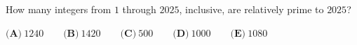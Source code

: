 How many integers from $1$ through $2025$, inclusive, are relatively prime to $2025$?

$\textbf{(A)}~1240\qquad\textbf{(B)}~1420\qquad\textbf{(C)}~500\qquad\textbf{(D)}~1000\qquad\textbf{(E)}~1080\qquad$
